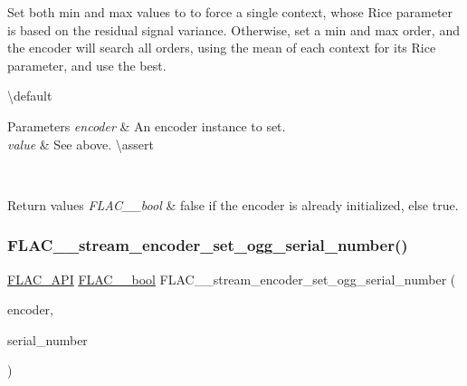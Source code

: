 Set both min and max values to {} to force a single context, whose Rice parameter is based on the residual signal variance. Otherwise, set a min and max order, and the encoder will search all orders, using the mean of each context for its Rice parameter, and use the best.

\textbackslash{}default {} 
\begin{DoxyParams}{Parameters}
{\em encoder} & An encoder instance to set. \\
\hline
{\em value} & See above. \textbackslash{}assert 
\begin{DoxyCode}{1}
\end{DoxyCode}
 \\
\hline
\end{DoxyParams}

\begin{DoxyRetVals}{Return values}
{\em F\+L\+A\+C\+\_\+\+\_\+bool} & {\ttfamily false} if the encoder is already initialized, else {\ttfamily true}. \\
\hline
\end{DoxyRetVals}
\mbox{\label{group__flac__stream__encoder_ga646c9800d42620a6c504fbdfbd092666}} 
\subsubsection{\texorpdfstring{FLAC\_\_stream\_encoder\_set\_ogg\_serial\_number()}{FLAC\_\_stream\_encoder\_set\_ogg\_serial\_number()}}
{\footnotesize\ttfamily \mbox{\hyperlink{group__flac__export_ga56ca07df8a23310707732b1c0007d6f5}{F\+L\+A\+C\+\_\+\+A\+PI}} \mbox{\hyperlink{ordinals_8h_a95103469f1cbd78b8cf250194985b34e}{F\+L\+A\+C\+\_\+\+\_\+bool}} F\+L\+A\+C\+\_\+\+\_\+stream\+\_\+encoder\+\_\+set\+\_\+ogg\+\_\+serial\+\_\+number (\begin{DoxyParamCaption}\item[{\mbox{\hyperlink{struct_f_l_a_c_____stream_encoder}{F\+L\+A\+C\+\_\+\+\_\+\+Stream\+Encoder}} $\ast$}]{encoder,  }\item[{long}]{serial\+\_\+number }\end{DoxyParamCaption})}

